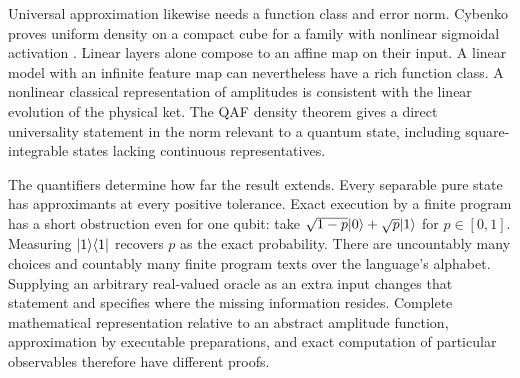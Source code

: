 Universal approximation likewise needs a function class and error norm. Cybenko proves uniform density on a compact cube for a family with nonlinear sigmoidal activation \cite{cybenko}. Linear layers alone compose to an affine map on their input. A linear model with an infinite feature map can nevertheless have a rich function class. A nonlinear classical representation of amplitudes is consistent with the linear evolution of the physical ket. The QAF density theorem gives a direct universality statement in the norm relevant to a quantum state, including square-integrable states lacking continuous representatives.

The quantifiers determine how far the result extends. Every separable pure state has approximants at every positive tolerance. Exact execution by a finite program has a short obstruction even for one qubit: take $\sqrt{1-p}\lvert 0\rangle+\sqrt p\lvert 1\rangle$ for $p\in[0,1]$. Measuring $\lvert 1\rangle\langle 1\rvert$ recovers $p$ as the exact probability. There are uncountably many choices and countably many finite program texts over the language's alphabet. Supplying an arbitrary real-valued oracle as an extra input changes that statement and specifies where the missing information resides. Complete mathematical representation relative to an abstract amplitude function, approximation by executable preparations, and exact computation of particular observables therefore have different proofs.
